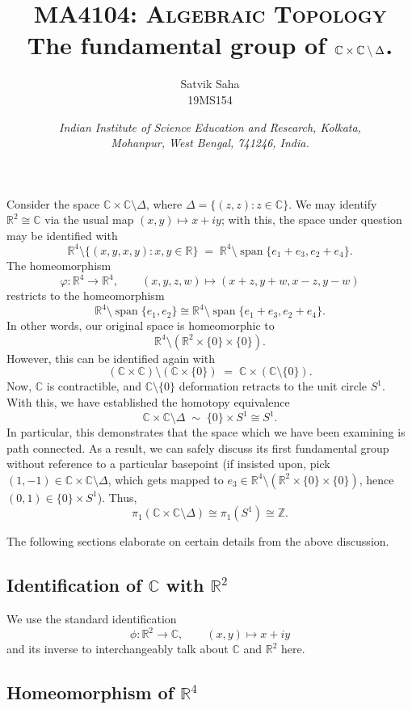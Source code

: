 \documentclass[11pt]{article}
\title{
    \Large\textsc{MA4104: Algebraic Topology} \\
    \vspace{10pt}
    {\huge\bf The fundamental group of $\C\times\C\setminus\Delta$.}
    \vspace{-1em}
}
\author{
    \large Satvik Saha%
    \\\textsc{\small 19MS154}
}
\date{\normalsize
    \textit{Indian Institute of Science Education and Research, Kolkata, \\
    Mohanpur, West Bengal, 741246, India.} \\
}
\def\C{\mathbb{C}}
\def\R{\mathbb{R}}
\def\Z{\mathbb{Z}}
\theoremstyle{definition}
\theoremstyle{remark}
\begin{document}
    \maketitle

    Consider the space $\C\times\C\setminus\Delta$, where $\Delta = \{(z, z): z \in
    \C\}$. We may identify $\R^2 \cong \C$ via the usual map $(x, y) \mapsto x + iy$;
    with this, the space under question may be identified with \[
        \R^4\setminus\{(x, y, x, y): x, y \in \R\} \;=\;
        \R^4\setminus\operatorname{span}\{e_1 + e_3, e_2 + e_4\}.
    \] The homeomorphism \[
        \varphi\colon \R^4 \to \R^4, \qquad
        (x, y, z, w) \mapsto (x + z, y + w, x - z, y - w)
    \] restricts to the homeomorphism \[
        \R^4\setminus\operatorname{span}\{e_1, e_2\} \cong
        \R^4\setminus\operatorname{span}\{e_1 + e_3, e_2 + e_4\}.
    \] In other words, our original space is homeomorphic to \[
        \R^4\setminus(\R^2\times\{0\}\times\{0\}).
    \] However, this can be identified again with \[
        (\C\times\C) \setminus(\C\times\{0\}) \;=\; \C \times (\C\setminus\{0\}).
    \] Now, $\C$ is contractible, and $\C\setminus\{0\}$ deformation retracts to the
    unit circle $S^1$. With this, we have established the homotopy equivalence \[
        \C\times\C\setminus\Delta \;\sim\; \{0\} \times S^1 \cong S^1.
    \] In particular, this demonstrates that the space which we have been examining
    is path connected. As a result, we can safely discuss its first fundamental group
    without reference to a particular basepoint (if insisted upon, pick $(1, -1) \in
    \C\times\C\setminus\Delta$, which gets mapped to $e_3 \in \R^4\setminus(\R^2
    \times \{0\} \times \{0\})$, hence $(0, 1) \in \{0\}\times S^1$). Thus, \[
        \pi_1(\C\times\C\setminus\Delta) \cong \pi_1(S^1) \cong \Z.
    \]


    The following sections elaborate on certain details from the above discussion.


    \subsection*{Identification of $\C$ with $\R^2$}

    We use the standard identification \[
        \phi\colon \R^2 \to \C, \qquad (x, y) \mapsto x + iy
    \] and its inverse to interchangeably talk about $\C$ and $\R^2$ here.


    \subsection*{Homeomorphism of $\R^4$}
\end{document}
